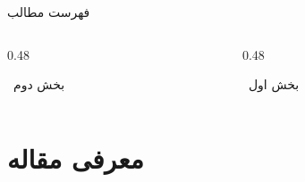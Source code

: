 \documentclass[aspectratio=169,11pt]{beamer}
\begin{document}
\begin{frame}{فهرست مطالب}
	\begin{LTR}
		\begin{columns}[t]
			\begin{column}{0.48\textwidth}
				\begin{RTL}
					\begin{block}{\faListUl\ بخش دوم}
						\tableofcontents[sections={5-8}]
					\end{block}
				\end{RTL}
			\end{column}
			\hfill
			\begin{column}{0.48\textwidth}
				\begin{RTL}
					\begin{block}{\faListUl\ بخش اول}
						\tableofcontents[sections={1-4}]
					\end{block}
				\end{RTL}
			\end{column}
		\end{columns}
	\end{LTR}
\end{frame}

\section{معرفی مقاله}
\end{document}

